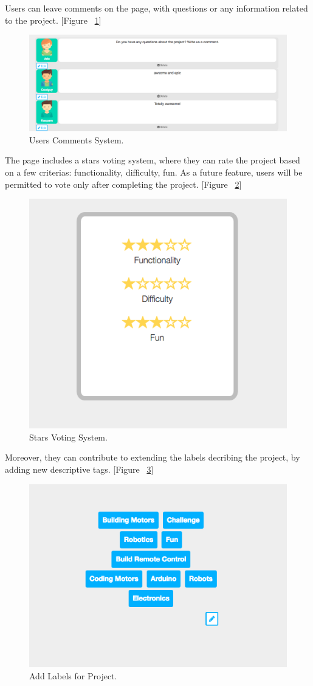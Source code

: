 Users can leave comments on the page, with questions or any information related to the project. [Figure ~\ref{fig:comments}] 

\begin{figure}[h!]
\includegraphics[width=1\linewidth]{images/ui/Comments.png}
\caption{Users Comments System.}
\label{fig:comments}
\end{figure}

The page includes a stars voting system, where they can rate the project based on a few criterias: functionality, difficulty, fun. As a future feature, users will be permitted to vote only after completing the project. [Figure ~\ref{fig:stars_voting_system}] 

\begin{figure}[h!]
\centering
\includegraphics[width=0.5\linewidth]{images/ui/StarsVotingSystem.png}
\caption{Stars Voting System.}
\label{fig:stars_voting_system}
\end{figure}


Moreover, they can contribute to extending the labels decribing the project, by adding new descriptive tags. [Figure ~\ref{fig:add_labels}] \\

\begin{figure}
\centering
\includegraphics[width=0.5\linewidth]{images/ui/AddLabels.png}
\caption{Add Labels for Project.}
\label{fig:add_labels}
\end{figure}





